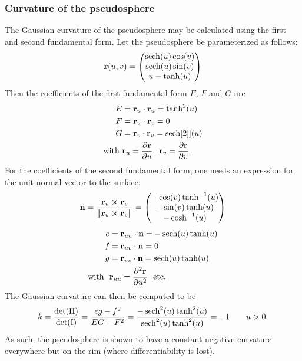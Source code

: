 \subsubsection{Curvature of the pseudosphere}
The Gaussian curvature of the pseudosphere may be calculated using the first and second fundamental form. Let the pseudosphere be parameterized as follows: 
    \[ 
        \vb{r}(u, v) = \mqty(\sech(u)\cos(v)\\
                      \sech(u)\sin(v)\\
                  u - \tanh(u))
    \]
Then the coefficients of the first fundamental form \(E\), \(F\) and \(G\) are
    \[
        \begin{split}
            E &= \vb{r}_u \cdot \vb{r}_u = \tanh[2](u) \\
            F &= \vb{r}_u \cdot \vb{r}_v = 0 \\
            G &= \vb{r}_v \cdot \vb{r}_v = \sech[2]](u) \\
            \text{with } & \vb{r}_u = \pdv{\vb{r}}{u},\ \vb{r}_v = \pdv{\vb{r}}{v}.
        \end{split}
    \]
For the coefficients of the second fundamental form, one needs an expression for the unit normal vector to the surface:
    \[
        \vb{n} =  \frac{\vb{r}_u \cross \vb{r}_v}{\norm{\vb{r}_u \cross \vb{r}_v}} 
        = \mqty(-\cos(v)\tanh[-1](u) \\
                -\sin(v)\tanh(u)\\
                -\cosh[-1](u)\\
                )
    \]
\begin{equation*}
    \begin{split}
        e &= \vb{r}_{uu} \cdot \vb{n} = -\sech(u)\tanh(u)\\
        f &= \vb{r}_{uv} \cdot \vb{n} = 0\\
        g &= \vb{r}_{vv} \cdot \vb{n} = \sech(u)\tanh(u)\\
        \text{with }\ & \vb{r}_{uu} = \pdv[2]{\vb{r}}{u}\ \text{ etc.}
    \end{split}
\end{equation*}
The Gaussian curvature can then be computed to be \cite{ONeill2006}
\begin{equation}
    k = \frac{\det(\mathrm{II})}{\det(\mathrm{I})} = \frac{eg - f^2}{EG - F^2} = \frac{-\sech[2](u)\tanh[2](u)}{\sech[2](u)\tanh[2](u)} = -1 \qquad u > 0.
\end{equation}
As such, the pseudosphere is shown to have a constant negative curvature everywhere but on the rim (where differentiability is lost).


